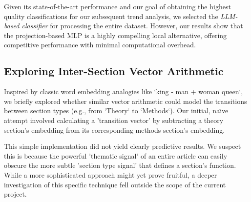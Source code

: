 Given its state-of-the-art performance and our goal of obtaining the highest quality classifications for our subsequent trend analysis, we selected the \emph{LLM-based classifier} for processing the entire dataset. However, our results show that the projection-based MLP is a highly compelling local alternative, offering competitive performance with minimal computational overhead.

\subsection{Exploring Inter-Section Vector Arithmetic}

Inspired by classic word embedding analogies like `king - man + woman \approx
queen`, we briefly explored whether similar vector arithmetic could model the
transitions between section types (e.g., from `Theory` to `Methods`).
Our initial, na\"{\i}ve attempt involved calculating a 'transition vector' by
subtracting a theory section's embedding from its corresponding methods
section's embedding.

This simple implementation did not yield clearly predictive results. We suspect
this is because the powerful 'thematic signal' of an entire article can easily
obscure the more subtle 'section type signal' that defines a section's function.
While a more sophisticated approach might yet prove fruitful, a deeper
investigation of this specific technique fell outside the scope of the current
project.